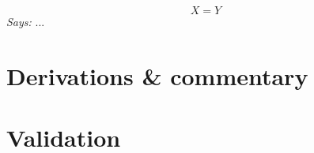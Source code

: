 \documentclass[11pt,a4paper]{article}
\begin{document}
\begin{equation}\label{eq:placeholder}
  X = Y
\end{equation}
\textit{Says:} ...

\section{Derivations \& commentary}

\begin{commentary}
\end{commentary}

\section{Validation}
\end{document}

